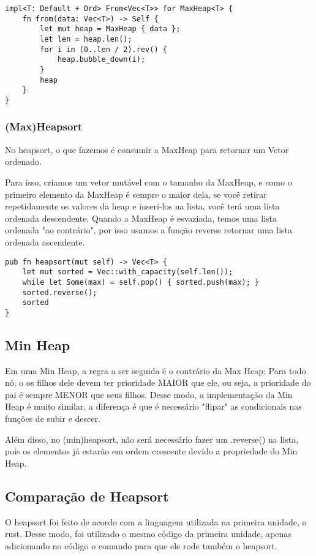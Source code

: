 \begin{lstlisting}
impl<T: Default + Ord> From<Vec<T>> for MaxHeap<T> {
    fn from(data: Vec<T>) -> Self {
        let mut heap = MaxHeap { data };
        let len = heap.len();
        for i in (0..len / 2).rev() {
            heap.bubble_down(i);
        }
        heap
    }
}
\end{lstlisting}

\subsubsection{(Max)Heapsort}

No heapsort, o que fazemos é consumir a MaxHeap para retornar um Vetor ordenado.

Para isso, criamos um vetor mutável com o tamanho da MaxHeap, e como o primeiro elemento
da MaxHeap é sempre o maior dela, se você retirar repetidamente os valores da heap e inseri-los na lista, você
terá uma lista ordenada descendente. Quando a MaxHeap é esvaziada, temos uma lista ordenada
"ao contrário", por isso usamos a função reverse retornar uma lista ordenada ascendente.

\begin{lstlisting}
pub fn heapsort(mut self) -> Vec<T> {
    let mut sorted = Vec::with_capacity(self.len());
    while let Some(max) = self.pop() { sorted.push(max); }
    sorted.reverse();
    sorted
}
\end{lstlisting}

\subsection{Min Heap}

Em uma Min Heap, a regra a ser seguida é o contrário da Max Heap: Para todo nó,
o os filhos dele devem ter prioridade MAIOR que ele, ou seja, a prioridade do pai
é sempre MENOR que seus filhos. 
Desse modo, a implementação da Min Heap
é muito similar, a diferença é que é necessário "flipar" as condicionais nas funções de subir
e descer. 

Além disso, no (min)heapsort, não será necessário fazer um .reverse() na lista, pois os elementos 
já estarão em ordem crescente devido a propriedade do Min Heap.

\subsection{Comparação de Heapsort}

O heapsort foi feito de acordo com a linguagem utilizada na primeira
unidade, o rust. Desse modo, foi utilizado o mesmo código da primeira unidade,
apenas adicionando no código o comando para que ele rode também o heapsort.

